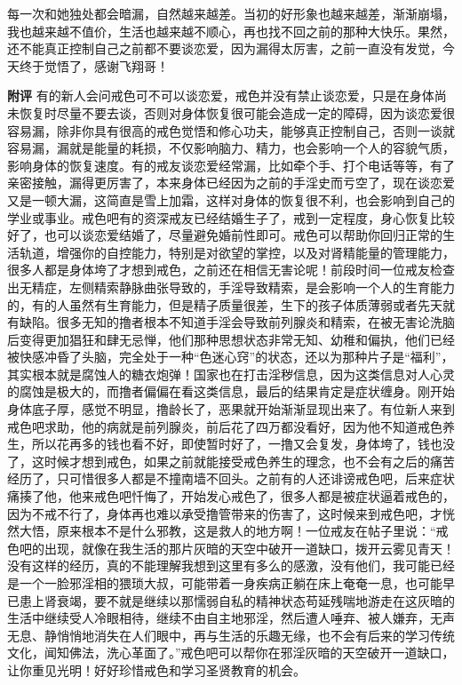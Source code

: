 \begin{case}
    每一次和她独处都会暗漏，自然越来越差。当初的好形象也越来越差，渐渐崩塌，我也越来越不值价，生活也越来越不顺心，再也找不回之前的那种大快乐。果然，还不能真正控制自己之前都不要谈恋爱，因为漏得太厉害，之前一直没有发觉，今天终于觉悟了，感谢飞翔哥！

    \textbf{附评} 有的新人会问戒色可不可以谈恋爱，戒色并没有禁止谈恋爱，只是在身体尚未恢复时尽量不要去谈，否则对身体恢复很可能会造成一定的障碍，因为谈恋爱很容易漏，除非你具有很高的戒色觉悟和修心功夫，能够真正控制自己，否则一谈就容易漏，漏就是能量的耗损，不仅影响脑力、精力，也会影响一个人的容貌气质，影响身体的恢复速度。有的戒友谈恋爱经常漏，比如牵个手、打个电话等等，有了亲密接触，漏得更厉害了，本来身体已经因为之前的手淫史而亏空了，现在谈恋爱又是一顿大漏，这简直是雪上加霜，这样对身体的恢复很不利，也会影响到自己的学业或事业。戒色吧有的资深戒友已经结婚生子了，戒到一定程度，身心恢复比较好了，也可以谈恋爱结婚了，尽量避免婚前性即可。戒色可以帮助你回归正常的生活轨道，增强你的自控能力，特别是对欲望的掌控，以及对肾精能量的管理能力，很多人都是身体垮了才想到戒色，之前还在相信无害论呢！前段时间一位戒友检查出无精症，左侧精索静脉曲张导致的，手淫导致精索，是会影响一个人的生育能力的，有的人虽然有生育能力，但是精子质量很差，生下的孩子体质薄弱或者先天就有缺陷。很多无知的撸者根本不知道手淫会导致前列腺炎和精索，在被无害论洗脑后变得更加猖狂和肆无忌惮，他们那种思想状态非常无知、幼稚和偏执，他们已经被快感冲昏了头脑，完全处于一种“色迷心窍”的状态，还以为那种片子是“福利”，其实根本就是腐蚀人的糖衣炮弹！国家也在打击淫秽信息，因为这类信息对人心灵的腐蚀是极大的，而撸者偏偏在看这类信息，最后的结果肯定是症状缠身。刚开始身体底子厚，感觉不明显，撸龄长了，恶果就开始渐渐显现出来了。有位新人来到戒色吧求助，他的病就是前列腺炎，前后花了四万都没看好，因为他不知道戒色养生，所以花再多的钱也看不好，即使暂时好了，一撸又会复发，身体垮了，钱也没了，这时候才想到戒色，如果之前就能接受戒色养生的理念，也不会有之后的痛苦经历了，只可惜很多人都是不撞南墙不回头。之前有的人还诽谤戒色吧，后来症状痛揍了他，他来戒色吧忏悔了，开始发心戒色了，很多人都是被症状逼着戒色的，因为不戒不行了，身体再也难以承受撸管带来的伤害了，这时候来到戒色吧，才恍然大悟，原来根本不是什么邪教，这是救人的地方啊！一位戒友在帖子里说：“戒色吧的出现，就像在我生活的那片灰暗的天空中破开一道缺口，拨开云雾见青天！没有这样的经历，真的不能理解我想到这里有多么的感激，没有他们，我可能已经是一个一脸邪淫相的猥琐大叔，可能带着一身疾病正躺在床上奄奄一息，也可能早已患上肾衰竭，要不就是继续以那懦弱自私的精神状态苟延残喘地游走在这灰暗的生活中继续受人冷眼相待，继续不由自主地邪淫，然后遭人唾弃、被人嫌弃，无声无息、静悄悄地消失在人们眼中，再与生活的乐趣无缘，也不会有后来的学习传统文化，闻知佛法，洗心革面了。”戒色吧可以帮你在邪淫灰暗的天空破开一道缺口，让你重见光明！好好珍惜戒色和学习圣贤教育的机会。
\end{case}

